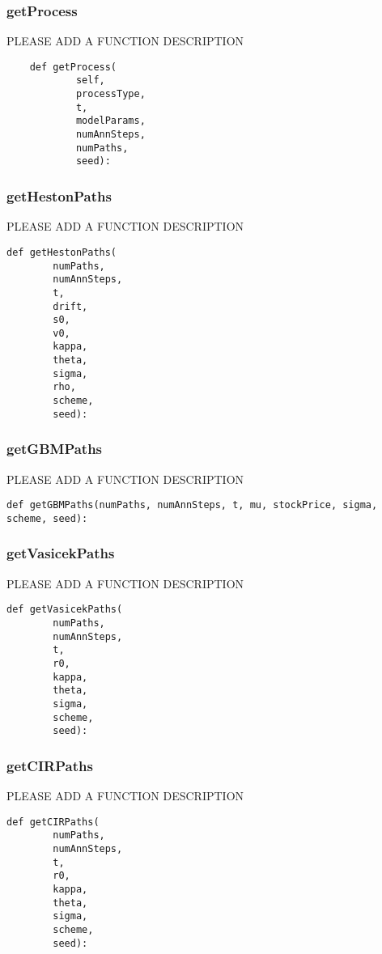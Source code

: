 \documentclass[twoside,11pt]{book}
\begin{document}
\subsubsection*{{\bf getProcess}}
PLEASE ADD A FUNCTION DESCRIPTION

\begin{lstlisting}
    def getProcess(
            self,
            processType,
            t,
            modelParams,
            numAnnSteps,
            numPaths,
            seed):
\end{lstlisting}

\subsubsection*{{\bf getHestonPaths}}
PLEASE ADD A FUNCTION DESCRIPTION

\begin{lstlisting}
def getHestonPaths(
        numPaths,
        numAnnSteps,
        t,
        drift,
        s0,
        v0,
        kappa,
        theta,
        sigma,
        rho,
        scheme,
        seed):
\end{lstlisting}

\subsubsection*{{\bf getGBMPaths}}
PLEASE ADD A FUNCTION DESCRIPTION

\begin{lstlisting}
def getGBMPaths(numPaths, numAnnSteps, t, mu, stockPrice, sigma, scheme, seed):
\end{lstlisting}

\subsubsection*{{\bf getVasicekPaths}}
PLEASE ADD A FUNCTION DESCRIPTION

\begin{lstlisting}
def getVasicekPaths(
        numPaths,
        numAnnSteps,
        t,
        r0,
        kappa,
        theta,
        sigma,
        scheme,
        seed):
\end{lstlisting}

\subsubsection*{{\bf getCIRPaths}}
PLEASE ADD A FUNCTION DESCRIPTION

\begin{lstlisting}
def getCIRPaths(
        numPaths,
        numAnnSteps,
        t,
        r0,
        kappa,
        theta,
        sigma,
        scheme,
        seed):
\end{lstlisting}
\end{document}
